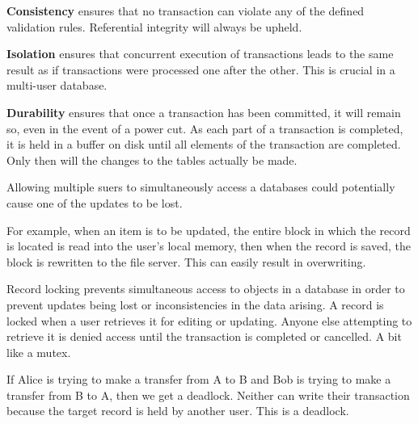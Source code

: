 \documentclass[../main.tex]{subfile}
\begin{document}
\textbf{Consistency} ensures that no transaction can violate any of the defined validation rules. Referential integrity will always be upheld.

\textbf{Isolation} ensures that concurrent execution of transactions leads to the same result as if transactions were processed one after the other. This is crucial in a multi-user database.

\textbf{Durability} ensures that once a transaction has been committed, it will remain so, even in the event of a power cut. As each part of a transaction is completed, it is held in a buffer on disk until all elements of the transaction are completed. Only then will the changes to the tables actually be made.


Allowing multiple suers to simultaneously access a databases could potentially cause one of the updates to be lost.

For example, when an item is to be updated, the entire block in which the record is located is read into the user's local memory, then when the record is saved, the block is rewritten to the file server. This can easily result in overwriting.

Record locking prevents simultaneous access to objects in a database in order to prevent updates being lost or inconsistencies in the data arising. A record is locked when a user retrieves it for editing or updating. Anyone else attempting to retrieve it is denied access until the transaction is completed or cancelled. A bit like a mutex.

If Alice is trying to make a transfer from A to B and Bob is trying to make a transfer from B to A, then we get a deadlock. Neither can write their transaction because the target record is held by another user. This is a deadlock.
\end{document}
